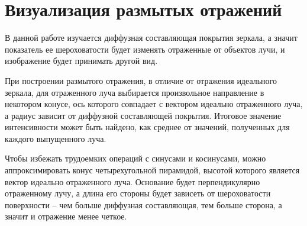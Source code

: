 



\section{Визуализация размытых отражений}

В данной работе изучается диффузная составляющая покрытия зеркала, а значит показатель ее шероховатости будет изменять отраженные от объектов лучи, и изображение будет принимать другой вид.

При построении размытого отражения, в отличие от отражения идеального зеркала, для отраженного луча выбирается произвольное направление в некотором конусе, ось которого совпадает с вектором идеально отраженного луча, а радиус зависит от диффузной составляющей покрытия. Итоговое значение интенсивности может быть найдено, как среднее от значений, полученных для каждого выпущенного луча.

Чтобы избежать трудоемких операций с синусами и косинусами, можно аппроксимировать конус четырехугольной пирамидой, высотой которого является вектор идеально отраженного луча. Основание будет перпендикулярно отраженному лучу, а длина его стороны будет зависеть от шероховатости поверхности -- чем больше диффузная составляющая, тем больше сторона, а значит и отражение менее четкое.\newline

